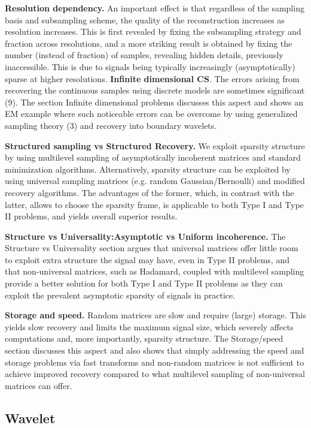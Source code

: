 \documentclass{article}
\begin{document}
 \textbf{Resolution dependency.} An important effect is that regardless of  the sampling basis and subsampling scheme, the quality of the reconstruction increases as resolution increases. This is first revealed by fixing the subsampling strategy and fraction across resolutions, and a more striking result is obtained by fixing the number (instead of fraction) of samples, revealing hidden details, previously inaccessible. This is due to signals being typically increasingly (asymptotically)
sparse at higher resolutions. 
 \textbf{Infinite dimensional CS}. The errors arising from recovering the continuous samples using discrete models are sometimes significant (9). The section Infinite dimensional problems discusses this aspect and shows an EM
 example where such noticeable errors can be overcome by using generalized sampling theory (3) and recovery into boundary wavelets.
 
\textbf{Structured sampling vs Structured Recovery.} We exploit sparsity structure by using multilevel sampling of asymptotically incoherent matrices and standard minimization algorithms. Alternatively, sparsity structure can be exploited by using universal sampling matrices (e.g. random Gaussian/Bernoulli) and modified recovery algorithms. The advantages of the former, which, in contrast with the latter, allows to choose
the sparsity frame, is applicable to both Type I and Type II problems, and yields overall superior results.

\textbf{Structure vs Universality:Asymptotic vs Uniform incoherence.}
The Structure vs Universality section argues that universal matrices offer little room to exploit extra structure the signal may have, even in Type II problems, and that non-universal matrices, such as Hadamard, coupled with multilevel sampling provide a better solution for both Type I and Type II problems as they can exploit the prevalent asymptotic sparsity of signals in practice.

\textbf{Storage and speed.} Random matrices are slow and require (large) storage. This yields slow recovery and limits the maximum signal size, which severely affects computations and, more importantly, sparsity structure. The Storage/speed section discusses this aspect and also shows that simply addressing the speed and storage problems via fast transforms and non-random matrices is not sufficient to achieve improved recovery compared to what multilevel sampling of non-universal matrices can offer.


\subsection{Wavelet}
\end{document}
